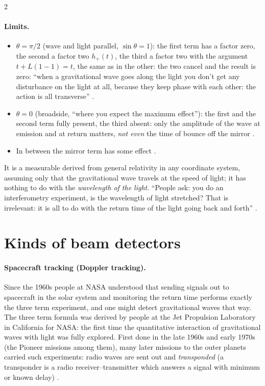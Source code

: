 \begin{paracol}{2}
\paragraph{Limits.}
\begin{itemize}
  \item $\theta=\pi/2$ (wave and light parallel, $\sin\theta=1$): the first term has a factor zero, the second a factor two $h_+(t)$, the third a factor two with the argument $t+L(1-1)=t$, the same as in the other: the two cancel and the result is zero: ``when a gravitational wave goes along the light you don't get any disturbance on the light at all, because they keep phase with each other: the action is all transverse'' .
  \item $\theta=0$ (broadside, ``where you expect the maximum effect''): the first and the second term fully present, the third absent: only the amplitude of the wave at emission and at return matters, \emph{not even} the time of bounce off the mirror .
  \item In between the mirror term has some effect .
\end{itemize}
It is a measurable derived from general relativity in any coordinate system, assuming only that the gravitational wave travels at the speed of light; it has nothing to do with the \emph{wavelength of the light}. ``People ask: you do an interferometry experiment, is the wavelength of light stretched? That is irrelevant: it is all to do with the return time of the light going back and forth'' .

\section{Kinds of beam detectors}\label{sec:c28-kinds}

\paragraph{Spacecraft tracking (Doppler tracking).} Since the 1960s people at NASA understood that sending signals out to spacecraft in the solar system and monitoring the return time performs exactly the three term experiment, and one might detect gravitational waves that way. The three term formula was derived by people at the Jet Propulsion Laboratory in California for NASA: the first time the quantitative interaction of gravitational waves with light was fully explored. First done in the late 1960s and early 1970s (the Pioneer missions among them), many later missions to the outer planets carried such experiments: radio waves are sent out and \emph{transponded} (a transponder is a radio receiver--transmitter which answers a signal with minimum or known delay) .


\end{paracol}
